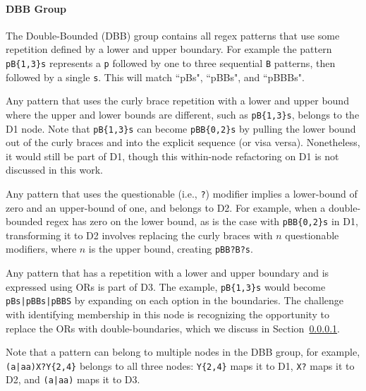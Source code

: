 
\paragraph{DBB Group}
The Double-Bounded (DBB) group contains all regex patterns that use some repetition defined by a lower and upper boundary.  For example the pattern \verb!pB{1,3}s! represents a \verb!p! followed by one to three sequential \verb!B! patterns, then followed by a single \verb!s!.  This will match ``pBs", ``pBBs", and ``pBBBs".  

\begin{description}  \itemsep -1pt
\item[D1:] Any pattern that  uses the curly brace repetition with a lower and upper bound where the upper and lower bounds are different, such as  \verb!pB{1,3}s!, belongs to the D1 node. 
Note that  \verb!pB{1,3}s! can become \verb!pBB{0,2}s! by pulling the lower bound out of the curly braces and into the explicit sequence (or visa versa). Nonetheless, it would still be part of D1, though this within-node refactoring on D1 is not discussed in this work. 
\item[D2:] Any pattern that uses the questionable (i.e., \verb!?!) modifier implies a lower-bound of zero and an upper-bound of one, and belongs to D2. For example, when a double-bounded regex has zero on the lower bound, as is the case with \verb!pBB{0,2}s!  in D1, transforming it to D2 involves replacing the curly braces with $n$ questionable modifiers, where $n$ is the upper bound,  creating \verb!pBB?B?s!. 
\item[D3:] Any pattern that has a repetition with a lower and upper boundary and is expressed using ORs is part of D3.  The example, \verb!pB{1,3}s! would become \verb!pBs|pBBs|pBBS! by expanding on each option in the boundaries. The challenge with identifying membership in this node is recognizing the opportunity to replace the ORs with double-boundaries, which we discuss in Section~\ref{}. 

\end{description}

Note that a pattern can belong to multiple nodes in the DBB group, for example, \verb!(a|aa)X?Y{2,4}! belongs to all three nodes: \verb!Y{2,4}! maps it to D1, \verb!X?!  maps it to D2, and \verb!(a|aa)!  maps it to D3. 

